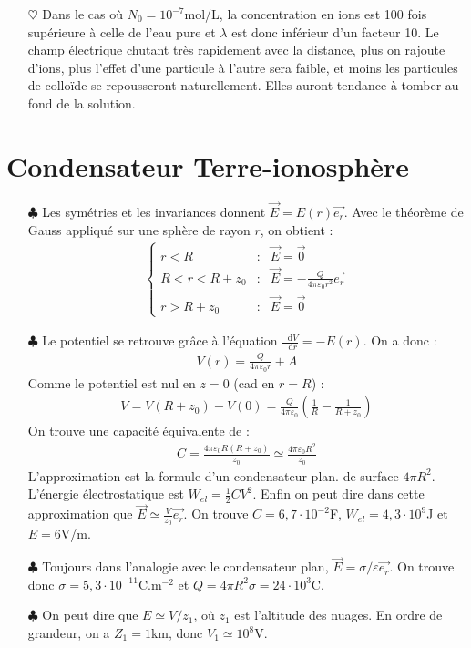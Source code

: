 \documentclass{report}
\newcommand*\dif{\mathop{}\!\mathrm{d}}
\begin{document}
\begin{itemize}
	\item[$\heartsuit$] Dans le cas où $N_0=10^{-7}$mol/L, la concentration en ions est 100 fois supérieure à celle de l'eau pure et $\lambda$ est donc inférieur d'un facteur 10. Le champ électrique chutant très rapidement avec la distance, plus on rajoute d'ions, plus l'effet d'une particule à l'autre sera faible, et moins les particules de colloïde se repousseront naturellement. Elles auront tendance à tomber au fond de la solution.
	
\end{itemize}

\section*{Condensateur Terre-ionosphère}

\begin{itemize}

	\item[$\clubsuit$] Les symétries et les invariances donnent $\vec{E}=E(r)\vec{e_r}$. Avec le théorème de Gauss appliqué sur une sphère de rayon $r$, on obtient :
	\begin{align*}
	\left\lbrace
	\begin{array}{ccc}
	r<R & : & \vec{E}=\vec{0} \\
	R<r<R+z_0 & : & \vec{E} = -\frac{Q}{4\pi\varepsilon_0 r^2}\vec{e_r} \\
	r>R+z_0 & : & \vec{E}=\vec{0}
	\end{array}\right.
\end{align*}

	\item[$\clubsuit$] Le potentiel se retrouve grâce à l'équation $\frac{\dif V}{\dif r}=-E(r)$. On a donc :
	\begin{align*}
		V(r) = \frac{Q}{4\pi\varepsilon_0 r}+A
	\end{align*}
Comme le potentiel est nul en $z=0$ (cad en $r=R$) :
	\begin{align*}
		V = V(R+z_0)-V(0) = \frac{Q}{4\pi\varepsilon_0}\left(\frac{1}{R}-\frac{1}{R+z_0} \right) 
	\end{align*}
On trouve une capacité équivalente de :
	\begin{align*}
		C = \frac{4\pi\varepsilon_0R(R+z_0)}{z_0}\simeq\frac{4\pi\varepsilon_0R^2}{z_0}
	\end{align*}
	L'approximation est la formule d'un condensateur plan. de surface $4\pi R^2$. L'énergie électrostatique est $W_{el}=\frac{1}{2}CV^2$. Enfin on peut dire dans cette approximation que $\vec{E}\simeq\frac{V}{z_0}\vec{e_r}$. On trouve $C=6,7\cdot10^{-2}$F, $W_{el}=4,3\cdot10^{9}$J et $E=6$V/m.
	
	\item[$\clubsuit$] Toujours dans l'analogie avec le condensateur plan, $\vec{E}=\sigma/\varepsilon\vec{e_r}$. On trouve donc $\sigma=5,3\cdot10^{-11}$C.m$^{-2}$ et $Q=4\pi R^2\sigma=24\cdot10^{3}$C.
	
	\item[$\clubsuit$] On peut dire que $E\simeq V/z_1$, où $z_1$ est l'altitude des nuages. En ordre de grandeur, on a $Z_1=1$km, donc $V_1\simeq10^8$V.
	
\end{itemize}
\end{document}
